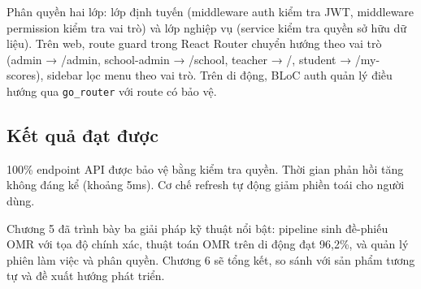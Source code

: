 ﻿\documentclass[../DoAn.tex]{subfiles}
\begin{document}
Phân quyền hai lớp: lớp định tuyến (middleware auth kiểm tra JWT, middleware permission kiểm tra vai trò) và lớp nghiệp vụ (service kiểm tra quyền sở hữu dữ liệu). Trên web, route guard trong React Router chuyển hướng theo vai trò (admin → /admin, school-admin → /school, teacher → /, student → /my-scores), sidebar lọc menu theo vai trò. Trên di động, BLoC auth quản lý điều hướng qua \texttt{go\_router} với route có bảo vệ.

\subsection{Kết quả đạt được}
100\% endpoint API được bảo vệ bằng kiểm tra quyền. Thời gian phản hồi tăng không đáng kể (khoảng 5ms). Cơ chế refresh tự động giảm phiền toái cho người dùng.

Chương 5 đã trình bày ba giải pháp kỹ thuật nổi bật: pipeline sinh đề-phiếu OMR với tọa độ chính xác, thuật toán OMR trên di động đạt 96,2\%, và quản lý phiên làm việc và phân quyền. Chương 6 sẽ tổng kết, so sánh với sản phẩm tương tự và đề xuất hướng phát triển.
\end{document}
